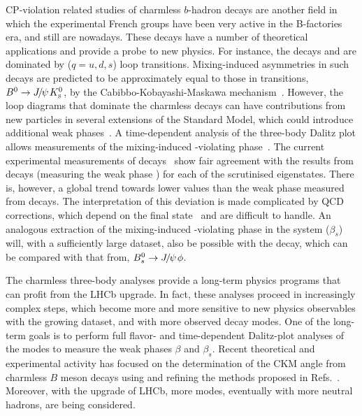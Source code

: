 CP-violation related studies of charmless $b$-hadron decays are another field in which the experimental French groups have been  very active in the B-factories era, and still are nowadays.  These decays have a number of theoretical applications and provide a probe to new physics. For instance, the decays \BdtoKsPiPi and \BdtoKsKK are dominated by \btoqqbars ($q = u,d,s$) loop transitions.  Mixing-induced \CP asymmetries in such decays are predicted to be approximately equal to those in \btoccbars transitions, \eg ${{B}^0}\rightarrow{\ensuremath{{J\mskip -3mu/\mskip -2mu\psi\mskip 2mu}}}{\ensuremath{{K}^0_{\rm\scriptscriptstyle S}}}$, by the
Cabibbo-Kobayashi-Maskawa mechanism~\cite{Cabibbo:1963yz,Kobayashi:1973fv}.
However, the loop diagrams that dominate the charmless decays can have
contributions from new particles in several extensions of the Standard Model,
which could introduce additional weak phases~\cite{Buchalla:2005us,Grossman:1996ke,London:1997zk,Ciuchini:1997zp}.
A time-dependent analysis of the three-body Dalitz plot allows measurements of
the mixing-induced \CP-violating
phase~\cite{Dalseno:2008wwa,Aubert:2009me,Nakahama:2010nj,Lees:2012kxa}. 
 The current experimental measurements of \btoqqbars decays~\cite{HFAG} show
fair agreement with the results from \btoccbars decays (measuring the weak
phase \Pbeta) for each of the scrutinised \CP eigenstates.
There is, however, a global trend towards lower values than the weak phase
measured from \btoccbars decays.
The interpretation of this deviation is made complicated by QCD
corrections, which depend on the final state~\cite{Silvestrini:2007yf} and
are difficult to handle.
An analogous extraction of the mixing-induced \CP-violating phase in the
\Bs system ($\beta_s$) will, with a sufficiently large dataset, also be possible with
the \BstoKsKPi decay, which can be compared with that from, \eg
${{B}^0_{s}}\rightarrow{\ensuremath{{J\mskip -3mu/\mskip -2mu\psi\mskip 2mu}}}\phi$.

The charmless three-body analyses provide a long-term physics programs that can profit from the LHCb upgrade. In fact, these analyses proceed in increasingly complex steps, which become more and more sensitive to new physics observables with the growing dataset, and with more observed decay modes. One of the long-term goals is to perform full flavor- and time-dependent Dalitz-plot analyses of the \BstoKshhp modes to measure the weak phases $\beta$ and $\beta_s$. Recent theoretical and experimental activity has focused on the determination of the CKM angle \Pgamma from charmless $B$ meson decays using and refining the methods proposed in Refs.~\cite{Ciuchini:2006kv,Gronau:2006qn,Bhattacharya:2013cla}. Moreover, with the upgrade of LHCb, more modes, eventually with more neutral hadrons, are being considered. 




